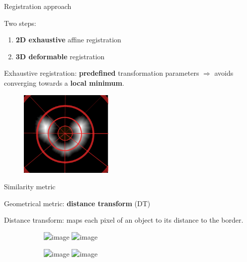 \documentclass[10pt]{beamer}
\begin{document}
\begin{frame}{Registration approach}
  
  Two steps:
  \begin{enumerate}
  \item \textbf{2D exhaustive} affine registration
  \item \textbf{3D deformable} registration
  \end{enumerate}

  \alert{Exhaustive registration}: \textbf{predefined} transformation parameters  $\Rightarrow$ avoids converging towards a \textbf{local minimum}.

  \begin{figure}[ht]
    \centering
    \includegraphics[width=0.4\textwidth]{fig/exhaustive_registration}
    \caption{}
    \label{fig:exhaustive_registration}
  \end{figure}

  
\end{frame}

\begin{frame}{Similarity metric}

  Geometrical metric: \textbf{distance transform} (DT)

  \alert{Distance transform}: maps each pixel of an object to its distance to the border.

  \begin{figure}[ht]
    \centering
    \begin{subfigure}[t]{0.5\textwidth}
      \centering
      \includegraphics<1>[width=0.65\textwidth]{fig/mri_slice6.png}%
      \includegraphics<2>[width=0.65\textwidth]{fig/mri_slice6_dt.png}
      \caption{}
      \label{subfig:mri_slice6_dt.png}
    \end{subfigure}%
    \begin{subfigure}[t]{0.5\textwidth}
      \centering
      \includegraphics<1>[width=0.65\textwidth]{fig/maldi_slice6.png}%
      \includegraphics<2>[width=0.65\textwidth]{fig/maldi_slice6_dt.png}
      \caption{}
      \label{subfig:maldi_slice6_dt.png}
    \end{subfigure}%
  \end{figure}

  
\end{frame}
\end{document}
